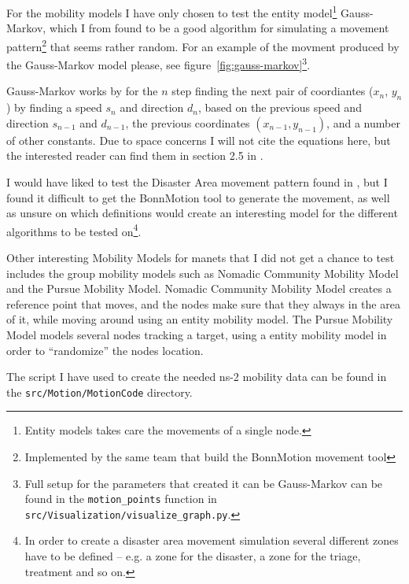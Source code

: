 
For the mobility models I have only chosen to test the entity model\footnote{Entity models takes care the movements of a single node.} Gauss-Markov, which I from \cite{MobilityAdHocResearch} found to be a good algorithm for simulating a movement pattern\footnote{Implemented by the same team that build the BonnMotion movement tool} that seems rather random. For an example of the movment produced by the Gauss-Markov model please, see figure~\ref{fig:gauss-markov}\footnote{Full setup for the parameters that created it can be Gauss-Markov can be found in the \texttt{motion\_points} function in \texttt{src/Visualization/visualize\_graph.py}.}. 

Gauss-Markov works by for the $n$ step finding the next pair of coordiantes  ($x_n$, $y_n$) by finding a speed $s_n$ and direction $d_n$, based on the previous speed and direction $s_{n-1}$ and $d_{n-1}$, the previous coordinates $(x_{n-1}, y_{n-1})$, and a number of other constants. Due to space concerns I will not cite the equations here, but the interested reader can find them in section 2.5 in \cite{MobilityAdHocResearch}.

I would have liked to test the Disaster Area movement pattern found in \cite{disasterArea}, but I found it difficult to get the BonnMotion tool to generate the movement, as well as unsure on which definitions would create an interesting model for the different algorithms to be tested on\footnote{In order to create a disaster area movement simulation several different zones have to be defined -- e.g. a zone for the disaster, a zone for the triage, treatment and so on.}.

Other interesting Mobility Models for \acp{manet} that I did not get a chance to test includes the group mobility models such as Nomadic Community Mobility Model \cite{MobilityAdHocResearch} and the Pursue Mobility Model. Nomadic Community Mobility Model creates a reference point that moves, and the nodes make sure that they always in the area of it, while moving around using an entity mobility model. The Pursue Mobility Model models several nodes tracking a target, using a entity mobility model in order to ``randomize'' the nodes location.

The script I have used to create the needed ns-2 mobility data can be found in the \texttt{src/Motion/MotionCode} directory.

